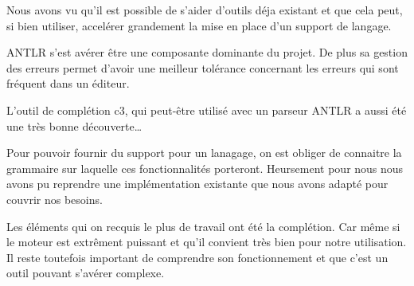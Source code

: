 \documentclass[
    iict, %
    il, %
]{heig-tb}
\begin{document}

Nous avons vu qu'il est possible de s'aider d'outils déja existant et que cela peut, si bien utiliser, accelérer grandement la mise en place d'un support de langage.

ANTLR s'est avérer être une composante dominante du projet. De plus sa gestion des erreurs permet d'avoir une meilleur tolérance concernant les erreurs
qui sont fréquent dans un éditeur.

L'outil de complétion c3, qui peut-être utilisé avec un parseur ANTLR a aussi été une très bonne découverte\dots









Pour pouvoir fournir du support pour un lanagage, on est obliger de connaitre la grammaire sur laquelle ces fonctionnalités porteront.
Heursement pour nous nous avons pu reprendre une implémentation existante que nous avons adapté pour couvrir nos besoins.


Les éléments qui on recquis le plus de travail ont été la complétion.
Car même si le moteur est extrêment puissant et qu'il convient très bien pour notre utilisation. Il reste toutefois important de comprendre son fonctionnement et que c'est un outil pouvant s'avérer complexe.
\end{document}
